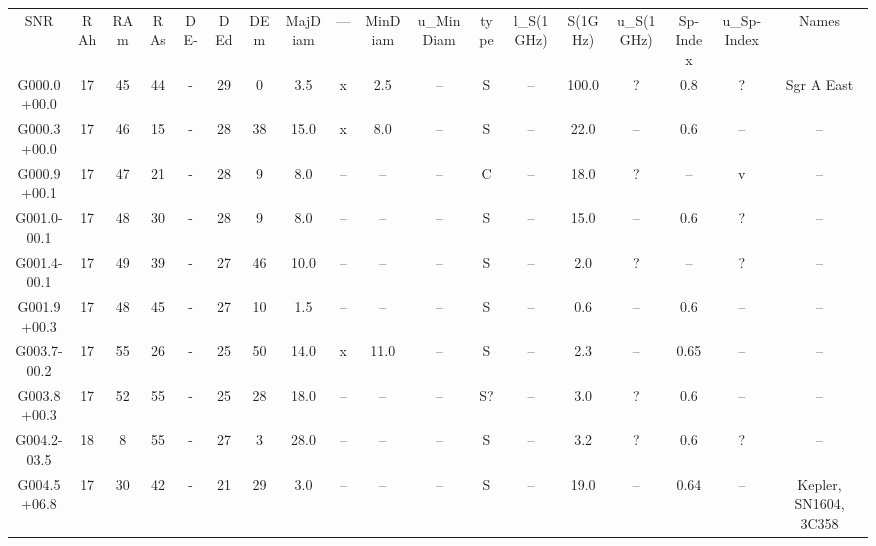 \begin{table}
\begin{tabular}{cccccccccccccccccc}
SNR & RAh & RAm & RAs & DE- & DEd & DEm & MajDiam & --- & MinDiam & u_MinDiam & type & l_S(1GHz) & S(1GHz) & u_S(1GHz) & Sp-Index & u_Sp-Index & Names \\
G000.0+00.0 & 17 & 45 & 44 & - & 29 & 0 & 3.5 & x & 2.5 & -- & S & -- & 100.0 & ? & 0.8 & ? & Sgr A East \\
G000.3+00.0 & 17 & 46 & 15 & - & 28 & 38 & 15.0 & x & 8.0 & -- & S & -- & 22.0 & -- & 0.6 & -- & -- \\
G000.9+00.1 & 17 & 47 & 21 & - & 28 & 9 & 8.0 & -- & -- & -- & C & -- & 18.0 & ? & -- & v & -- \\
G001.0-00.1 & 17 & 48 & 30 & - & 28 & 9 & 8.0 & -- & -- & -- & S & -- & 15.0 & -- & 0.6 & ? & -- \\
G001.4-00.1 & 17 & 49 & 39 & - & 27 & 46 & 10.0 & -- & -- & -- & S & -- & 2.0 & ? & -- & ? & -- \\
G001.9+00.3 & 17 & 48 & 45 & - & 27 & 10 & 1.5 & -- & -- & -- & S & -- & 0.6 & -- & 0.6 & -- & -- \\
G003.7-00.2 & 17 & 55 & 26 & - & 25 & 50 & 14.0 & x & 11.0 & -- & S & -- & 2.3 & -- & 0.65 & -- & -- \\
G003.8+00.3 & 17 & 52 & 55 & - & 25 & 28 & 18.0 & -- & -- & -- & S? & -- & 3.0 & ? & 0.6 & -- & -- \\
G004.2-03.5 & 18 & 8 & 55 & - & 27 & 3 & 28.0 & -- & -- & -- & S & -- & 3.2 & ? & 0.6 & ? & -- \\
G004.5+06.8 & 17 & 30 & 42 & - & 21 & 29 & 3.0 & -- & -- & -- & S & -- & 19.0 & -- & 0.64 & -- & Kepler, SN1604, 3C358 \\
\end{tabular}
\end{table}
